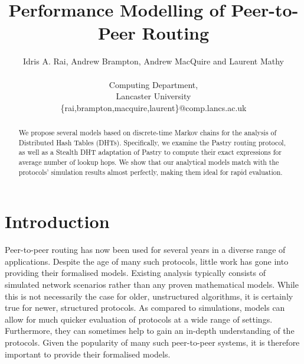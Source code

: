 \documentclass[10pt,twocolumn]{article}
\title{Performance Modelling of Peer-to-Peer Routing}
\author{
Idris A. Rai, Andrew Brampton, Andrew MacQuire and Laurent Mathy\\\\
Computing Department,\\
Lancaster University\\
\{rai,brampton,macquire,laurent\}@comp.lancs.ac.uk }
\begin{document}
\maketitle
\thispagestyle{empty}

\begin{abstract}
We propose several models based on discrete-time Markov chains for
the analysis of Distributed Hash Tables (DHTs). Specifically, we
examine the Pastry routing protocol, as well as a Stealth DHT
adaptation of Pastry to compute their exact expressions for average
number of lookup hops. We show that our analytical models match with
the protocols' simulation results almost perfectly, making them
ideal for rapid evaluation.
\end{abstract}


\section{Introduction}
Peer-to-peer routing has now been used for several years in a diverse range of
applications. Despite the age of many such protocols, little work has gone into
providing their formalised models. Existing analysis typically consists of
simulated network scenarios rather than any proven mathematical models. While
this is not necessarily the case for older, unstructured algorithms, it is
certainly true for newer, structured protocols. As compared to simulations,
models can allow for much quicker evaluation of protocols at a wide range of
settings. Furthermore, they can sometimes help to gain an in-depth
understanding of the protocols. Given the popularity of many such peer-to-peer
systems, it is therefore important to provide their formalised models.

\end{document}

